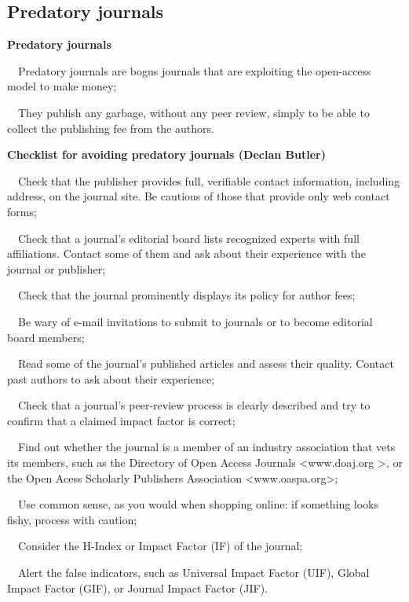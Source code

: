 \documentclass[a4paper, 12pt]{article}
\begin{document}
\newpage\subsection{Predatory journals}

\textbf{Predatory journals}
\par\ \textbullet\ Predatory journals are bogus journals that are exploiting the open-access model to make money;
\par\ \textbullet\ They publish any garbage, without any peer review, simply to be able to collect the publishing fee from the authors.

\textbf{Checklist for avoiding predatory journals (Declan Butler)}
\par\ \textbullet\ Check that the publisher provides full, verifiable contact information, including address,
on the journal site. Be cautious of those that provide only web contact forms;
\par\ \textbullet\ Check that a journal's editorial board lists recognized experts with full affiliations.
Contact some of them and ask about their experience with the journal or publisher;
\par\ \textbullet\ Check that the journal prominently displays its policy for author fees;
\par\ \textbullet\ Be wary of e-mail invitations to submit to journals or to become editorial board members;
\par\ \textbullet\ Read some of the journal's published articles and assess their quality. Contact past authors to ask about their experience;
\par\ \textbullet\ Check that a journal's peer-review process is clearly described and try to confirm that a claimed impact factor is correct;
\par\ \textbullet\ Find out whether the journal is a member of an industry association that vets its members,
such as the Directory of Open Access Journals \textless www.doaj.org \textgreater, or the Open Acess Scholarly Publishers Association \textless www.oaspa.org\textgreater;
\par\ \textbullet\ Use common sense, as you would when shopping online: if something looks fishy, process with caution;
\par\ \textbullet\ Consider the H-Index or Impact Factor (IF) of the journal;
\par\ \textbullet\ Alert the false indicators, such as Universal Impact Factor (UIF), Global Impact Factor (GIF), or Journal Impact Factor (JIF).
\end{document}
